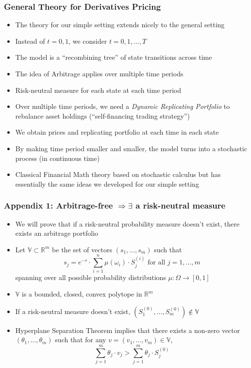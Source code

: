\documentclass{beamer}
\begin{document}
\begin{frame}
\frametitle{General Theory for Derivatives Pricing}
\begin{itemize}
\item The theory for our simple setting extends nicely to the general setting
\item Instead of $t=0,1$, we consider $t=0, 1, \ldots, T$
\item The model is a ``recombining tree'' of state transitions across time
\item The idea of Arbitrage applies over multiple time periods
\item Risk-neutral measure for each state at each time period
\item Over multiple time periods, we need a {\em Dynamic Replicating Portfolio} to rebalance asset holdings (``self-financing trading strategy'')
\item We obtain prices and replicating portfolio at each time in each state
\item By making time period smaller and smaller, the model turns into a stochastic process (in continuous time)
\item Classical Financial Math theory based on stochastic calculus but has essentially the same ideas we developed for our simple setting
\end{itemize}
\end{frame}

\appendix
\begin{frame}
\frametitle{Appendix 1: Arbitrage-free $\Rightarrow \exists$ a risk-neutral measure}
\begin{itemize}
\item We will prove that if a risk-neutral probability measure doesn't exist, there exists an arbitrage portfolio
\item Let $\mathbb{V} \subset \mathbb{R}^m$ be the set of vectors $(s_1, \ldots, s_m)$ such that
$$s_j = e^{-r} \cdot \sum_{i=1}^n \mu(\omega_i) \cdot S_j^{(i)} \mbox{ for all } j = 1, \ldots, m$$
spanning over all possible probability distributions $\mu: \Omega \rightarrow [0,1]$
\item $\mathbb{V}$ is a bounded, closed, convex polytope in $\mathbb{R}^m$
\item If a risk-neutral measure doesn't exist, $(S_1^{(0)}, \ldots, S_m^{(0)}) \not\in \mathbb{V}$
\item Hyperplane Separation Theorem implies that there exists a non-zero vector $(\theta_1, \ldots, \theta_m)$ such that
for any $v = (v_1, \ldots, v_m) \in \mathbb{V}$,
$$\sum_{j=1}^m \theta_j \cdot v_j > \sum_{j=1}^m \theta_j \cdot S_j^{(0)}$$
\end{itemize}
\end{frame}
\end{document}
